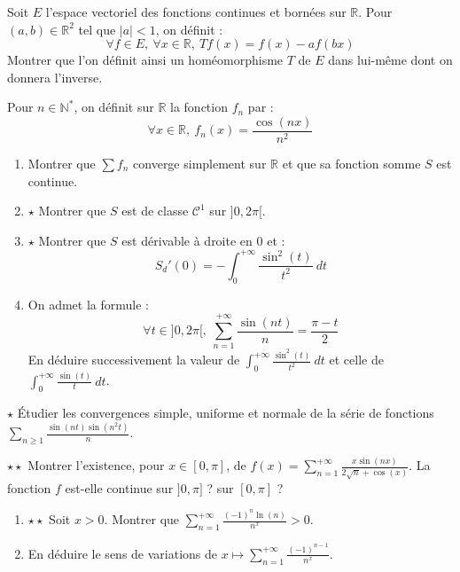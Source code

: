 \documentclass[french,a4paper]{article}
\newcommand{\N}{\mathbb{N}}
\newcommand{\R}{\mathbb{R}}
\newcommand{\st}{^*}
\theoremstyle{plain}
\theoremstyle{definition}
\theoremstyle{remark}
\begin{document}
\begin{ex}{}
	Soit $E$ l'espace vectoriel des fonctions continues et bornées sur $\R$. Pour $(a,b)\in\R^2$ tel que $\lvert a\rvert <1$, on définit : $$\forall f\in E,\ \forall x\in\R,\ Tf(x)=f(x)-af(bx)$$ Montrer que l'on définit ainsi un homéomorphisme $T$ de $E$ dans lui-même dont on donnera l'inverse.
\end{ex}

\begin{ex}{}
	Pour $n\in\N\st$, on définit sur $\R$ la fonction $f_n$ par : $$\forall x\in\R,\ f_n(x)=\frac{\cos(nx)}{n^2}$$
	\begin{enumerate}
		\item Montrer que $\sum f_n$ converge simplement sur $\R$ et que sa fonction somme $S$ est continue.
		\item $\star$ Montrer que $S$ est de classe $\mathcal{C}^1$ sur $]0,2\pi[$.
		\item $\star$ Montrer que $S$ est dérivable à droite en $0$ et : $$S_d'(0)=-\int_{0}^{+\infty}\frac{\sin^2(t)}{t^2}\ dt$$
		\item On admet la formule : $$\forall t\in]0,2\pi[,\ \sum_{n=1}^{+\infty}\frac{\sin(nt)}{n}=\frac{\pi-t}{2}$$ En déduire successivement la valeur de $\displaystyle\int_{0}^{+\infty}\frac{\sin^2(t)}{t^2}\ dt$ et celle de $\displaystyle\int_{0}^{+\infty}\frac{\sin(t)}{t}\ dt$.
	\end{enumerate}
\end{ex}

\begin{ex}{$\star$}
	Étudier les convergences simple, uniforme et normale de la série de fonctions $\displaystyle\sum_{n\geqslant 1}\frac{\sin(nt)\sin(n^2t)}{n}$.
\end{ex}

\begin{ex}{$\star\star$}
	Montrer l'existence, pour $x\in[0,\pi]$, de $f(x)=\displaystyle\sum_{n=1}^{+\infty}\frac{x\sin(nx)}{2\sqrt{n}+\cos(x)}$. La fonction $f$ est-elle continue sur $]0,\pi]$ ? sur $[0,\pi]$ ?
\end{ex}

\begin{ex}{}
	\begin{enumerate}
		\item $\star\star$ Soit $x>0$. Montrer que $\displaystyle\sum_{n=1}^{+\infty}\frac{(-1)^n\ln(n)}{n^x}>0$.
		\item En déduire le sens de variations de $x\mapsto\displaystyle\sum_{n=1}^{+\infty}\frac{(-1)^{n-1}}{n^x}$.
	\end{enumerate}
\end{ex}
\end{document}
